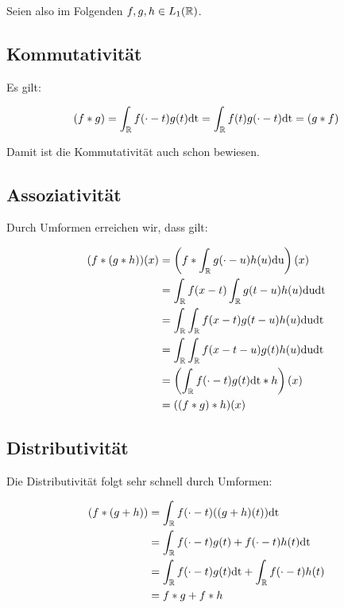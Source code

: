 Seien also im Folgenden $f,g,h\in L_1(\mathbb{R})$.

\subsection{Kommutativität}
Es gilt:

\begin{equation}\label{eq:faltungkommutativitaet}
  (f*g) = \int_{\mathbb{R}} f(\cdot - t)g(t)\text{dt} = \int_{\mathbb{R}} f(t)g(\cdot - t)\text{dt} = (g*f)
\end{equation}

Damit ist die Kommutativität auch schon bewiesen.

\subsection{Assoziativität}
Durch Umformen erreichen wir, dass gilt:

\begin{equation}\label{eq:faltungassoziativitaet}
  \begin{split}
    (f*(g*h))(x) &= \left(f * \int_{\mathbb{R}} g(\cdot -u)h(u)\text{du}\right)(x) \\
    &= \int_{\mathbb{R}} f(x-t)\int_{\mathbb{R}} g(t-u)h(u)\text{du}\text{dt} \\
    &= \int_{\mathbb{R}}\int_{\mathbb{R}} f(x-t) g(t-u)h(u)\text{du}\text{dt} \\
    &= \int_{\mathbb{R}}\int_{\mathbb{R}} f(x-t-u) g(t)h(u)\text{du}\text{dt} \\
    &= \left(\int_{\mathbb{R}} f(\cdot-t) g(t)\text{dt} * h\right)(x) \\
    &= ((f*g)*h)(x)
  \end{split}
\end{equation}

\subsection{Distributivität}
Die Distributivität folgt sehr schnell durch Umformen:

\begin{equation}\label{eq:faltungdistributivitaet}
  \begin{split}
    (f*(g+h)) &= \int_{\mathbb{R}} f(\cdot - t)((g+h)(t))\text{dt} \\
    &= \int_{\mathbb{R}} f(\cdot - t) g(t) + f(\cdot - t)h(t) \text{dt} \\
    &= \int_{\mathbb{R}} f(\cdot - t)g(t) \text{dt} + \int_{\mathbb{R}} f(\cdot -t)h(t) \\
    &= f*g + f*h
  \end{split}
\end{equation}


